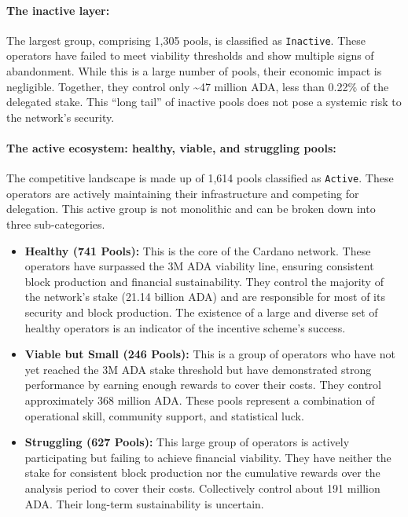 \documentclass[11pt, letterpaper]{article}
\begin{document}
\paragraph{The inactive layer:} The largest group, comprising 1,305 pools, is
classified as \texttt{Inactive}. These operators have failed to meet viability thresholds and show multiple
signs of abandonment. While this is a large number of pools, their economic
impact is negligible. Together, they control only \textasciitilde47 million
ADA, less than 0.22\% of the delegated stake. This ``long tail'' of inactive
pools does not pose a systemic risk to the network's security.

\paragraph{The active ecosystem: healthy, viable, and struggling pools:} The competitive landscape is made up of 1,614 pools classified as
\texttt{Active}. These operators are actively maintaining their infrastructure
and competing for delegation. This active group is not monolithic and can be
broken down into three sub-categories.
\begin{itemize}
	\item \textbf{Healthy (741 Pools):} This is the core of the Cardano network. These operators have surpassed
	      the 3M ADA viability line, ensuring consistent block production and financial sustainability. They control
	      the majority of the network's stake (21.14 billion ADA) and are responsible for most of its security and
	      block production. The existence of a large and diverse set of healthy operators is an indicator of the
	      incentive scheme's success.
	\item \textbf{Viable but Small (246 Pools):} This is a group of operators who have not yet reached the 3M
	      ADA stake threshold but have demonstrated strong performance by earning enough rewards to cover their
	      costs. They control approximately 368 million ADA\@. These pools represent a combination of operational
	      skill, community support, and statistical luck.
	\item \textbf{Struggling (627 Pools):} This large group of operators is actively participating but failing
	      to achieve financial viability. They have neither the stake for consistent block production nor the cumulative
	      rewards over the analysis period to cover their costs. Collectively control about 191 million ADA\@. Their long-term
	      sustainability is uncertain.
\end{itemize}
\end{document}
